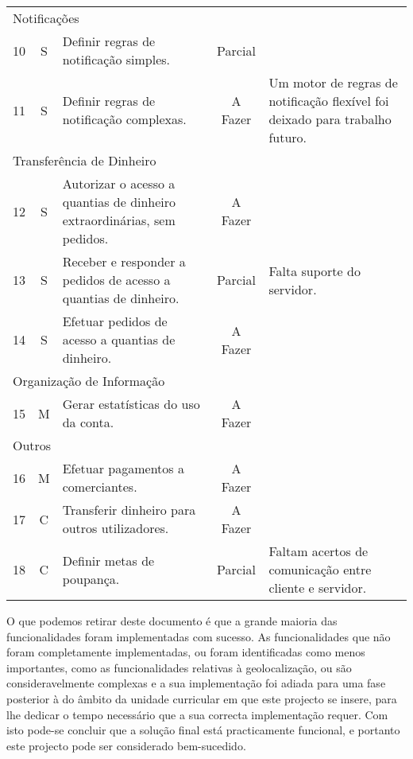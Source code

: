 \begin{center}
\begin{longtable}{@{}lcp{}cp{}@{}}
    \multicolumn{5}{l}{\color{gray} Notificações} \\
    10  & S & Definir regras de notificação simples. & Parcial &  \\
    11  & S & Definir regras de notificação complexas. & A Fazer & Um motor de regras de notificação flexível foi deixado para trabalho futuro. \\
    \multicolumn{5}{l}{\color{gray} Transferência de Dinheiro} \\
    12  & S & Autorizar o acesso a quantias de dinheiro extraordinárias, sem pedidos. & A Fazer &  \\
    13  & S & Receber e responder a pedidos de acesso a quantias de dinheiro. & Parcial & Falta suporte do servidor. \\
    14  & S & Efetuar pedidos de acesso a quantias de dinheiro. & A Fazer &  \\
    \multicolumn{5}{l}{\color{gray} Organização de Informação} \\
    15  & M & Gerar estatísticas do uso da conta. & A Fazer &  \\
    \multicolumn{5}{l}{\color{gray} Outros} \\
    16  & M & Efetuar pagamentos a comerciantes. & A Fazer &  \\
    17  & C & Transferir dinheiro para outros utilizadores. & A Fazer &  \\
    18  & C & Definir metas de poupança. & Parcial & Faltam acertos de comunicação entre cliente e servidor.
\end{longtable}
\end{center}

O que podemos retirar deste documento é que a grande maioria das funcionalidades foram implementadas com sucesso.
As funcionalidades que não foram completamente implementadas, ou foram identificadas como menos importantes, como as funcionalidades relativas à geolocalização, ou são consideravelmente complexas e a sua implementação foi adiada para uma fase posterior à do âmbito da unidade curricular em que este projecto se insere, para lhe dedicar o tempo necessário que a sua correcta implementação requer.
Com isto pode-se concluir que a solução final está practicamente funcional, e portanto este projecto pode ser considerado bem-sucedido.

